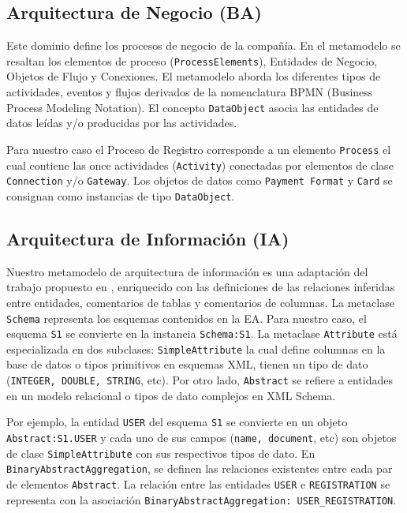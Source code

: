 \subsection{Arquitectura de Negocio (BA)}

Este dominio define los procesos de negocio de la compa\~n\'ia. En el metamodelo se resaltan los elementos de proceso (\texttt{ProcessElements}), Entidades de Negocio, Objetos de Flujo y Conexiones. El metamodelo aborda los diferentes tipos de actividades, eventos y flujos derivados de la nomenclatura BPMN (Business Process Modeling Notation). El concepto \texttt{DataObject} asocia las entidades de datos le\'idas y/o producidas por las actividades.

Para nuestro caso el Proceso de Registro corresponde a un elemento \texttt{Process} el cual contiene las once actividades (\texttt{Activity}) conectadas por elementos de clase \texttt{Connection} y/o \texttt{Gateway}. Los objetos de datos como \texttt{Payment Format} y \texttt{Card} se consignan como instancias de tipo \texttt{DataObject}.


\subsection{Arquitectura de Informaci\'on (IA)}

Nuestro metamodelo de arquitectura de informaci\'on es una adaptaci\'on del trabajo propuesto en \cite{Atzeni:2008}, enriquecido con las definiciones de las relaciones inferidas entre entidades, comentarios de tablas y comentarios de columnas. La metaclase \texttt{Schema} representa los esquemas contenidos en la EA. Para nuestro caso, el esquema \texttt{S1} se convierte en la instancia \texttt{Schema:S1}. La metaclase \texttt{Attribute} est\'a especializada en dos subclases: \texttt{SimpleAttribute} la cual define columnas en la base de datos o tipos primitivos en esquemas XML, tienen un tipo de dato (\texttt{INTEGER, DOUBLE, STRING}, etc). Por otro lado, \texttt{Abstract} se refiere a entidades en un modelo relacional o tipos de dato complejos en XML Schema.

Por ejemplo, la entidad \texttt{USER} del esquema \texttt{S1} se convierte en un objeto \texttt{Abstract:S1.USER} y cada uno de sus campos (\texttt{name, document}, etc) son objetos de clase \texttt{SimpleAttribute} con sus respectivos tipos de dato. En \texttt{BinaryAbstractAggregation}, se definen las relaciones existentes entre cada par de elementos \texttt{Abstract}. La relaci\'on entre las entidades \texttt{USER} e \texttt{REGISTRATION} se representa con la asociaci\'on \texttt{BinaryAbstractAggregation: USER\_REGISTRATION}. 


